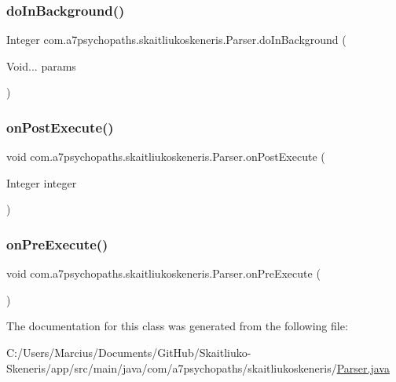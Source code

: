 \subsubsection{\texorpdfstring{do\+In\+Background()}{doInBackground()}}
{\footnotesize\ttfamily Integer com.\+a7psychopaths.\+skaitliukoskeneris.\+Parser.\+do\+In\+Background (\begin{DoxyParamCaption}\item[{Void...}]{params }\end{DoxyParamCaption})\hspace{0.3cm}{\ttfamily [protected]}}

\mbox{\label{classcom_1_1a7psychopaths_1_1skaitliukoskeneris_1_1_parser_a5b4cc7934c9a9ccf7e19e44010b74608}} 
\subsubsection{\texorpdfstring{on\+Post\+Execute()}{onPostExecute()}}
{\footnotesize\ttfamily void com.\+a7psychopaths.\+skaitliukoskeneris.\+Parser.\+on\+Post\+Execute (\begin{DoxyParamCaption}\item[{Integer}]{integer }\end{DoxyParamCaption})\hspace{0.3cm}{\ttfamily [protected]}}

\mbox{\label{classcom_1_1a7psychopaths_1_1skaitliukoskeneris_1_1_parser_a3c8f1848d81bc14088c6081fc5aded8b}} 
\subsubsection{\texorpdfstring{on\+Pre\+Execute()}{onPreExecute()}}
{\footnotesize\ttfamily void com.\+a7psychopaths.\+skaitliukoskeneris.\+Parser.\+on\+Pre\+Execute (\begin{DoxyParamCaption}{ }\end{DoxyParamCaption})\hspace{0.3cm}{\ttfamily [protected]}}



The documentation for this class was generated from the following file\+:\begin{DoxyCompactItemize}
\item 
C\+:/\+Users/\+Marcius/\+Documents/\+Git\+Hub/\+Skaitliuko-\/\+Skeneris/app/src/main/java/com/a7psychopaths/skaitliukoskeneris/\mbox{\hyperlink{_parser_8java}{Parser.\+java}}\end{DoxyCompactItemize}
